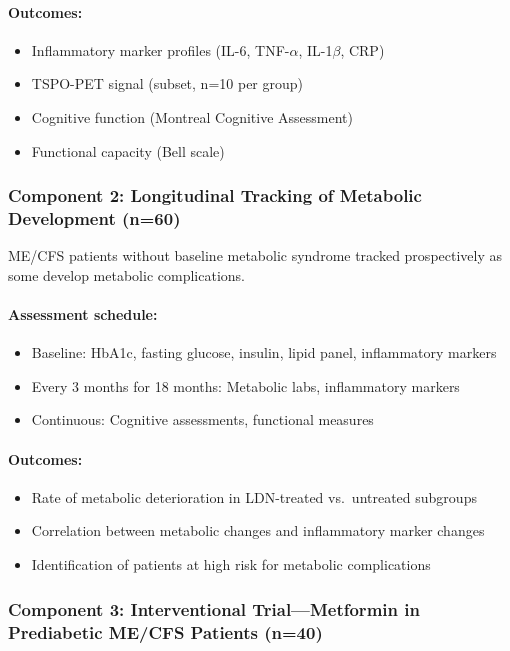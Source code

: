 \paragraph{Outcomes:}
\begin{itemize}
    \item Inflammatory marker profiles (IL-6, TNF-$\alpha$, IL-1$\beta$, CRP)
    \item TSPO-PET signal (subset, n=10 per group)
    \item Cognitive function (Montreal Cognitive Assessment)
    \item Functional capacity (Bell scale)
\end{itemize}

\subsubsection{Component 2: Longitudinal Tracking of Metabolic Development (n=60)}

ME/CFS patients without baseline metabolic syndrome tracked prospectively as some develop metabolic complications.

\paragraph{Assessment schedule:}
\begin{itemize}
    \item Baseline: HbA1c, fasting glucose, insulin, lipid panel, inflammatory markers
    \item Every 3 months for 18 months: Metabolic labs, inflammatory markers
    \item Continuous: Cognitive assessments, functional measures
\end{itemize}

\paragraph{Outcomes:}
\begin{itemize}
    \item Rate of metabolic deterioration in LDN-treated vs.\ untreated subgroups
    \item Correlation between metabolic changes and inflammatory marker changes
    \item Identification of patients at high risk for metabolic complications
\end{itemize}

\subsubsection{Component 3: Interventional Trial---Metformin in Prediabetic ME/CFS Patients (n=40)}

